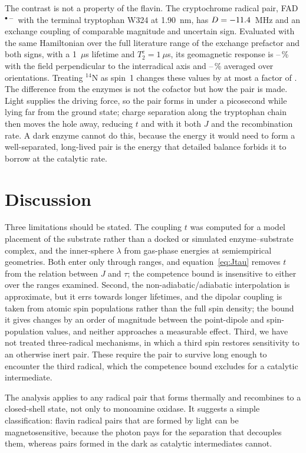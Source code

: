 \documentclass[journal=jpcbfk,manuscript=article,layout=traditional]{achemso}
\begin{document}
The contrast is not a property of the flavin. The cryptochrome radical pair,
FAD$^{\bullet-}$ with the terminal tryptophan W324 at 1.90~nm, has
$D = -11.4$~MHz and an exchange coupling of comparable magnitude and uncertain
sign.\cite{Efimova2008} Evaluated with the same Hamiltonian over the full
literature range of the exchange prefactor and both signs, with a 1~$\mu$s
lifetime and $T_2^e = 1~\mu$s,\cite{Kattnig2016} its geomagnetic response is
\cryNinetyMin--\cryNinetyMax\,\% with the field perpendicular to the
interradical axis and \cryPowderMin--\cryPowderMax\,\% averaged over
orientations. Treating $^{14}$N as spin~1 changes these values by at most a factor
of \spinOneRatio. The difference from the enzymes is not the cofactor but how the pair is
made. Light supplies the driving force, so the pair forms in under a picosecond
while lying far from the ground state; charge separation along the tryptophan
chain then moves the hole away, reducing $t$ and with it both $J$ and the
recombination rate. A dark enzyme cannot do this, because the energy it would
need to form a well-separated, long-lived pair is the energy that detailed
balance forbids it to borrow at the catalytic rate.

\section{Discussion}

Three limitations should be stated. The coupling $t$ was computed for a model
placement of the substrate rather than a docked or simulated enzyme--substrate
complex, and the inner-sphere $\lambda$ from gas-phase energies at semiempirical
geometries. Both enter only through ranges, and equation~\ref{eq:Jtau} removes
$t$ from the relation between $J$ and $\tau$; the competence bound is insensitive
to either over the ranges examined. Second, the non-adiabatic/adiabatic
interpolation is approximate, but it errs towards longer lifetimes, and the
dipolar coupling is taken from atomic spin populations rather than the full spin
density; the bound it gives changes by an order of magnitude between the
point-dipole and spin-population values, and neither approaches a measurable
effect. Third, we
have not treated three-radical mechanisms,\cite{Kattnig2017} in which a third
spin restores sensitivity to an otherwise inert pair. These require the pair to
survive long enough to encounter the third radical, which the competence bound
excludes for a catalytic intermediate.

The analysis applies to any radical pair that forms thermally and recombines to a
closed-shell state, not only to monoamine oxidase. It suggests a simple
classification: flavin radical pairs that are formed by light can be
magnetosensitive, because the photon pays for the separation that decouples
them, whereas pairs formed in the dark as catalytic intermediates cannot.
\end{document}
